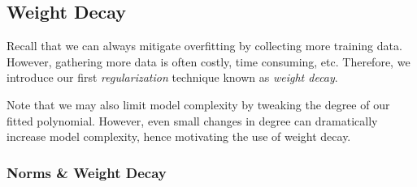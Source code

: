 \documentclass[a4paper,12pt]{article}
\theoremstyle{definition}
\begin{document}
    \subsection*{Weight Decay}
    Recall that we can always mitigate overfitting by collecting more training data. However, gathering more data is often costly, time consuming,
    etc. Therefore, we introduce our first \textit{regularization} technique known as \textit{weight decay}.
    
    Note that we may also limit model complexity by tweaking the degree of our fitted polynomial. However, even small
    changes in degree can dramatically increase model complexity, hence motivating the use of weight decay.

    \subsubsection*{Norms \& Weight Decay}
\end{document}
